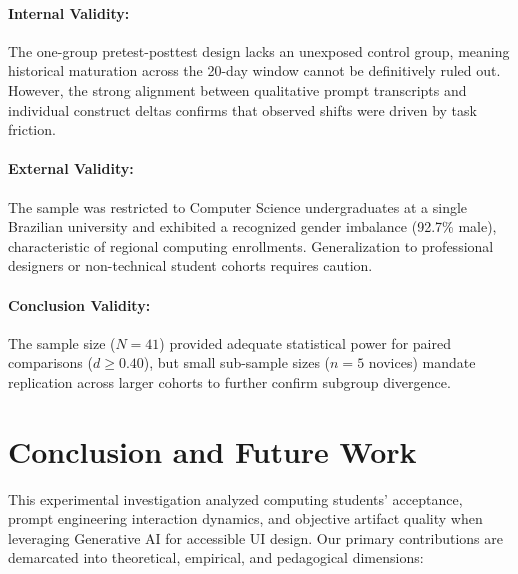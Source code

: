 \documentclass{cleiej}
\begin{document}
\paragraph{Internal Validity:}
The one-group pretest-posttest design lacks an unexposed control group, meaning historical maturation across the 20-day window cannot be definitively ruled out. However, the strong alignment between qualitative prompt transcripts and individual construct deltas confirms that observed shifts were driven by task friction.

\paragraph{External Validity:}
The sample was restricted to Computer Science undergraduates at a single Brazilian university and exhibited a recognized gender imbalance (92.7\% male), characteristic of regional computing enrollments. Generalization to professional designers or non-technical student cohorts requires caution.

\paragraph{Conclusion Validity:}
The sample size ($N = 41$) provided adequate statistical power for paired comparisons ($d \ge 0.40$), but small sub-sample sizes ($n = 5$ novices) mandate replication across larger cohorts to further confirm subgroup divergence.

\section{Conclusion and Future Work}
\label{sec:conclusion}

This experimental investigation analyzed computing students' acceptance, prompt engineering interaction dynamics, and objective artifact quality when leveraging Generative AI for accessible UI design. Our primary contributions are demarcated into theoretical, empirical, and pedagogical dimensions:
\end{document}
